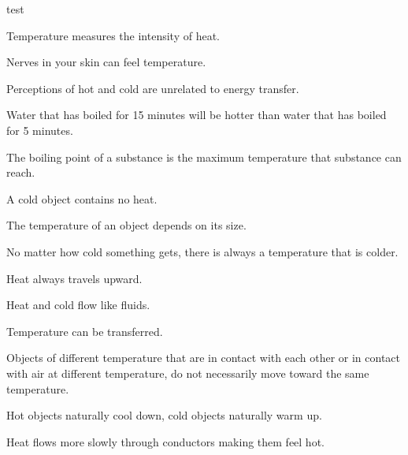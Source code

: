 \documentclass[10pt]{examdesign}
\begin{document}
test

\begin{truefalse}[title={True or False},
	rearrange=yes]
	
	\begin{question}
		 Temperature measures the intensity of heat. 
	\end{question}

	\begin{question}
		 Nerves in your skin can feel temperature. 
	\end{question}

	\begin{question}
	 Perceptions of hot and cold are unrelated to energy transfer. 
\end{question}
	 
	\begin{question}
		 Water that has boiled for 15 minutes will be hotter than water that has boiled for 5 minutes. 
	\end{question}
	\begin{question}
	 The boiling point of a substance is the maximum temperature that substance can reach.
\end{question}

\begin{question}
	 A cold object contains no heat.
\end{question}

\begin{question}
	 The temperature of an object depends on its size.
\end{question}

\begin{question}
	 No matter how cold something gets, there is always a temperature that is colder. 
\end{question}


\begin{question}
	 Heat always travels upward.  
\end{question}

\begin{question}
	  Heat and cold flow like fluids.
\end{question}
\begin{question}
	 Temperature can be transferred.  
\end{question}
\begin{question}
	 Objects of different temperature that are in contact with each other or in contact with air at different temperature, do not necessarily move toward the same temperature.
\end{question}
\begin{question}
	 Hot objects naturally cool down, cold objects naturally warm up.  
\end{question}
\begin{question}
	 Heat flows more slowly through conductors making them feel hot. 
\end{question}


\end{truefalse}
\end{document}

